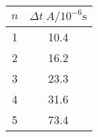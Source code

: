 \label{tab:tabAuge}
	\begin{tabular}{S[table-format=1.0]S[table-format=2.1]}
		\toprule
		{$n$} & {$\Delta t_.A/10^{-6}\si{\second}$} \\
		 & 10.4 \\
		2 & 16.2 \\
		3 & 23.3 \\
		4 & 31.6 \\
		5 & 73.4 \\
		\bottomrule
	\end{tabular}
